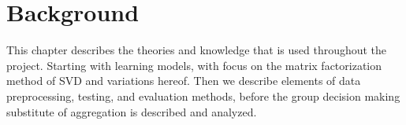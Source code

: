 \chapter{Background}\label{background}

This chapter describes the theories and knowledge that is used throughout the project. Starting with learning models, with focus on the matrix factorization method of SVD and variations hereof. Then we describe elements of data preprocessing, testing, and evaluation methods, before the group decision making substitute of aggregation is described and analyzed.





